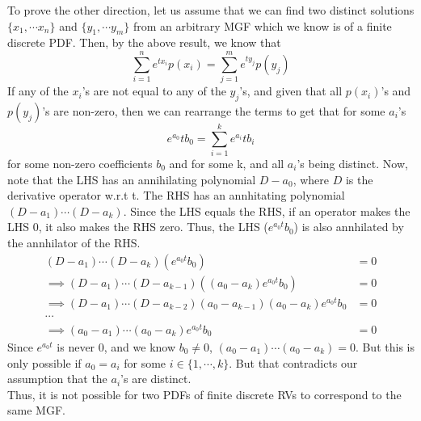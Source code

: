 To prove the other direction, let us assume that we can find two distinct solutions $\{x_1,\cdots x_n\}$ and $\{y_1,\cdots y_m\}$ from an arbitrary MGF which we know is of a finite discrete PDF. Then, by the above result, we know that
\[
    \sum_{i=1}^n e^{tx_i} p(x_i) = \sum_{j=1}^m e^{ty_j} p(y_j)
\]
If any of the $x_i$'s are not equal to any of the $y_j$'s, and given that all $p(x_i)$'s and $p(y_j)$'s are non-zero, then we can rearrange the terms to get that for some $a_i$'s
\[
    e^{a_0}t b_0 = \sum_{i=1}^k e^{a_i}t b_i
\]
for some non-zero coefficients $b_0$ and for some k, and all $a_i$'s being distinct. Now, note that the LHS has an annihilating polynomial $D-a_0$, where $D$ is the derivative operator w.r.t t. The RHS has an annhitating polynomial $(D-a_1)\cdots(D-a_k)$. Since the LHS equals the RHS, if an operator makes the LHS 0, it also makes the RHS zero. Thus, the LHS ($e^{a_0t}b_0$) is also annhilated by the annhilator of the RHS.
\begin{align*}
    (D-a_1)\cdots(D-a_k)(e^{a_0t}b_0) &= 0\\
    \implies (D-a_1)\cdots(D-a_{k-1})((a_0-a_k)e^{a_0t}b_0) &= 0\\
    \implies (D-a_1)\cdots(D-a_{k-2})(a_0-a_{k-1})(a_0-a_k)e^{a_0t}b_0 &= 0\\
    \cdots\\
    \implies (a_0-a_1)\cdots(a_0-a_k)e^{a_0t}b_0 &= 0
\end{align*}
Since $e^{a_0t}$ is never 0, and we know $b_0\ne 0$, $(a_0-a_1)\cdots(a_0-a_k)=0$. But this is only possible if $a_0 = a_i$ for some $i \in \{1,\cdots, k\}$. But that contradicts our assumption that the $a_i$'s are distinct.\\

Thus, it is not possible for two PDFs of finite discrete RVs to correspond to the same MGF.